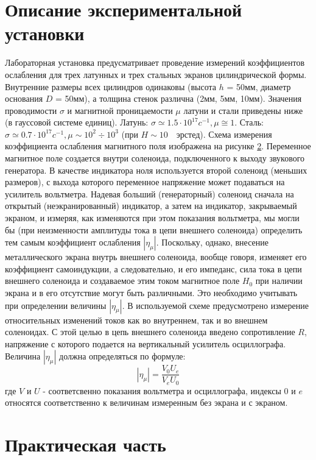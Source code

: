 \section{Описание экспериментальной установки}
Лабораторная установка предусматривает проведение измерений коэффициентов ослабления для трех латунных и трех стальных экранов цилиндрической формы. Внутренние размеры всех цилиндров одинаковы (высота $h$ = 50мм, диаметр основания $D$ = 50мм), а толщина стенок различна (2мм, 5мм, 10мм). Значения проводимости $\sigma$ и магнитной проницаемости $\mu$ латуни и стали приведены ниже (в гауссовой системе единиц).
Латунь: $\sigma \simeq 1.5\cdot 10^{17} c^{-1}, \mu \cong 1$.
Сталь: $\sigma \simeq 0.7\cdot 10^{17} c^{-1}, \mu \sim 10^2 \div 10^3 $ (при $H \sim 10\text{ }$ эрстед).
Схема измерения коэффициента ослабления магнитного поля изображена на рисунке \ref{}. Переменное магнитное поле создается внутри соленоида, подключенного к выходу звукового генератора. В качестве индикатора ноля используется второй соленоид (меньших размеров), с выхода которого переменное напряжение может подаваться на усилитель вольтметра. Надевая больший (генераторный) соленоид сначала на открытый (неэкранированный) индикатор, а затем на индикатор, закрываемый экраном, и измеряя, как изменяются при этом показания вольтметра, мы могли бы (при неизменности амплитуды тока в цепи внешнего соленоида) определить тем самым коэффициент ослабления $|\eta_{\mu}|$. Поскольку, однако, внесение металлического экрана внутрь внешнего соленоида, вообще говоря, изменяет его коэффициент самоиндукции, а следовательно, и его импеданс, сила тока в цепи внешнего соленоида и создаваемое этим током магнитное поле $H_0$ при наличии экрана и в его отсутствие могут быть различными. Это необходимо учитывать при определении величины $|\eta_{\mu}|$. В используемой схеме предусмотрено измерение относительных изменений токов как во внутреннем, так и во внешнем соленоидах. С этой целью в цепь внешнего соленоида введено сопротивление $R$, напряжение с которого подается на вертикальный усилитель осциллографа. Величина $|\eta_{\mu}|$ должна определяться по формуле:
\begin{equation}
	|\eta_{\mu}|=\frac{V_0U_e}{V_eU_0}
\label{eq:7}
\end{equation}
где $V$ и $U$ - соответсвенно показания вольтметра и осциллографа, индексы $0$ и $e$ относятся соответственно к величинам измеренным без экрана и с экраном.
\section{Практическая часть}

